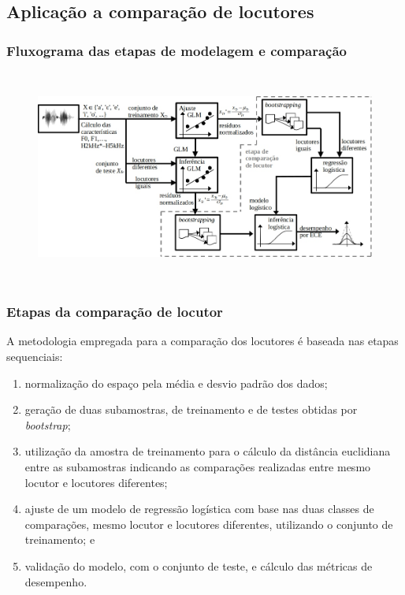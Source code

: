 \documentclass[121pt, aspectratio=169, t]{beamer}
\begin{document}
\subsection{Aplicação a comparação de locutores}
\begin{frame}[fragile=singleslide]
	\frametitle{Fluxograma das etapas de modelagem e comparação}
	\vspace{-0.35cm}
	\begin{figure}
		\centering
		\includegraphics[height=7cm]{Fluxograma_v2.jpg}
	\end{figure}
\end{frame}

\begin{frame}[fragile=singleslide]
	\frametitle{Etapas da comparação de locutor}
	A metodologia empregada para a comparação dos locutores é baseada nas etapas sequenciais: 
	\begin{enumerate}
		\item normalização do espaço pela média e desvio padrão dos dados;
		\item geração de duas subamostras, de treinamento e de testes obtidas por \textit{bootstrap};
		\item utilização da amostra de treinamento para o cálculo da distância euclidiana entre as subamostras indicando as comparações realizadas entre mesmo locutor e  locutores diferentes;
		\item ajuste de um modelo de regressão logística com base nas duas classes de comparações,  mesmo locutor e  locutores diferentes, utilizando o conjunto de treinamento; e 
		\item validação do modelo, com o conjunto de teste, e cálculo das métricas de desempenho.
	\end{enumerate}

\end{frame}
\end{document}

